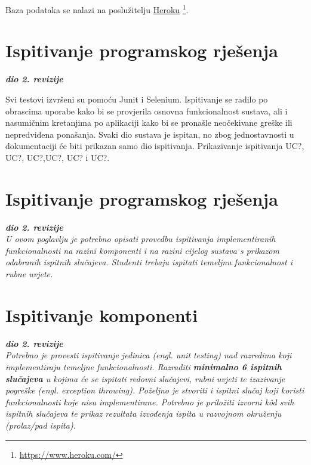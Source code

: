             Baza podataka se nalazi na poslužitelju \underline{Heroku}
            \footnote{\url{https://www.heroku.com/}}.
            
        
\newpage    
        \section{Ispitivanje programskog rješenja}
			
			\textbf{\textit{dio 2. revizije}}
			
			Svi testovi izvršeni su pomoću Junit i Selenium. Ispitivanje se radilo po obrascima uporabe kako bi
            se provjerila osnovna funkcionalnost sustava, ali i nasumičnim kretanjima po aplikaciji
            kako bi se pronašle neočekivane greške  ili nepredvidena ponašanja.
            Svaki dio sustava je ispitan, no zbog jednostavnosti u dokumentaciji će biti prikazan
            samo dio ispitivanja. Prikazivanje ispitivanja UC?, UC?, UC?,UC?, UC? i UC?.
            



		    \section{Ispitivanje programskog rješenja}
			
			\textbf{\textit{dio 2. revizije}}\\
			
			 \textit{U ovom poglavlju je potrebno opisati provedbu ispitivanja implementiranih funkcionalnosti na razini komponenti i na razini cijelog sustava s prikazom odabranih ispitnih slučajeva. Studenti trebaju ispitati temeljnu funkcionalnost i rubne uvjete.}
	           
	           \eject

            
              
            
\newpage            
        \section{Ispitivanje komponenti}
		    
		    \textbf{\textit{dio 2. revizije}}\\
    
			\textit{Potrebno je provesti ispitivanje jedinica (engl. unit testing) nad razredima koji implementiraju temeljne funkcionalnosti. Razraditi \textbf{minimalno 6 ispitnih slučajeva} u kojima će se ispitati redovni slučajevi, rubni uvjeti te izazivanje pogreške (engl. exception throwing). Poželjno je stvoriti i ispitni slučaj koji koristi funkcionalnosti koje nisu implementirane. Potrebno je priložiti izvorni kôd svih ispitnih slučajeva te prikaz rezultata izvođenja ispita u razvojnom okruženju (prolaz/pad ispita). }
			
